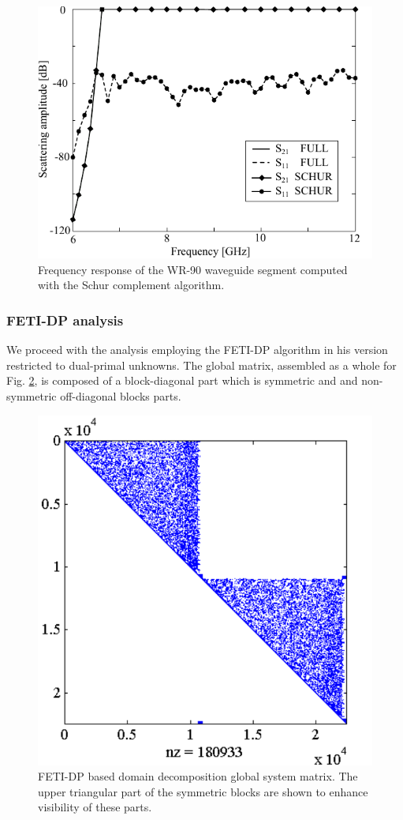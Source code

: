 \begin{figure}[ht!]
\centering
\includegraphics[width=13.4cm]{WRfreqSchur}
\caption{Frequency response of the WR-90 waveguide segment computed with the Schur complement algorithm.}
\label{fig:WRfreqSchur}
\end{figure}

\clearpage
\subsubsection{FETI-DP analysis}

We proceed with the analysis employing the FETI-DP algorithm in his version restricted to dual-primal unknowns. The global matrix, assembled as a whole for Fig. \ref{fig:DDFETIMat}, is composed of a block-diagonal part which is symmetric and and non-symmetric off-diagonal blocks parts.

\begin{figure}[ht!]
\centering
\includegraphics[width=12cm]{DDFETIMat}
\caption{FETI-DP based domain decomposition global system matrix. The upper triangular part of the symmetric blocks are  shown to enhance visibility of these parts. }
\label{fig:DDFETIMat}
\end{figure}

